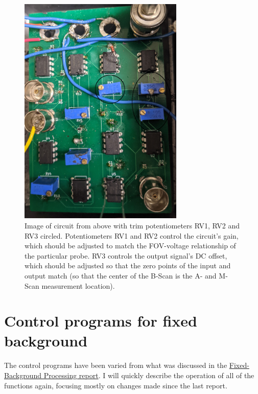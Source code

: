 \documentclass{article}
\begin{document}
\begin{figure}[!h]
	\centering
	\includegraphics[width=0.7\textwidth]{Data for Probe Writeup/circuit.jpg}
	\caption{Image of circuit from above with trim potentiometers RV1, RV2 and RV3 circled. Potentiometers RV1 and RV2 control the circuit's gain, which should be adjusted to match the FOV-voltage relationship of the particular probe. RV3 controls the output signal's DC offset, which should be adjusted so that the zero points of the input and output match (so that the center of the B-Scan is the A- and M-Scan measurement location).}\label{circ}
\end{figure}

\section{Control programs for fixed background}\label{controlprograms}
\hypertarget{controlprograms}{}

\par{The control programs have been varied from what was discussed in the \href{https://github.com/Brian-Frost-LaPlante/LabReports/blob/main/ProbeReports/Fixed-BackgroundProcessing.pdf}{Fixed-Background Processing report}. I will quickly describe the operation of all of the functions again, focusing mostly on changes made since the last report.}
\end{document}
